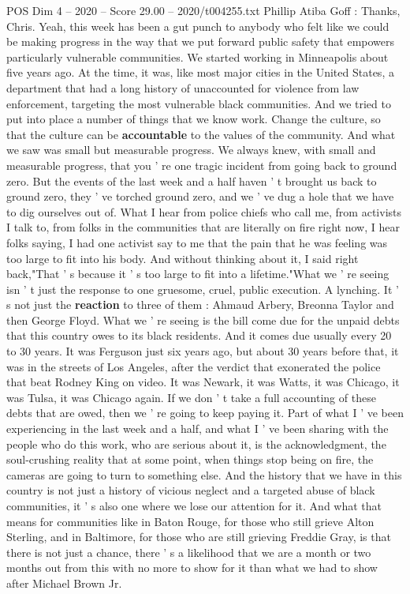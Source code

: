 \begin{textsample}{POS Dim 4 – 2020 – Score 29.00 – 2020/t004255.txt}
Phillip Atiba Goff : Thanks, Chris.
Yeah, this week has been a gut punch to anybody who felt like we could be making progress in the way that we put forward public safety that empowers particularly vulnerable communities.
We started working in Minneapolis about five years ago.
At the time, it was, like most major cities in the United States, a department that had a long history of unaccounted for violence from law enforcement, targeting the most vulnerable black communities.
And we tried to put into place a number of things that we know work.
Change the culture, so that the culture can be \textbf{accountable} to the values of the community.
And what we saw was small but measurable progress.
We always knew, with small and measurable progress, that you ' re one tragic incident from going back to ground zero.
But the events of the last week and a half haven ' t brought us back to ground zero, they ' ve torched ground zero, and we ' ve dug a hole that we have to dig ourselves out of.
What I hear from police chiefs who call me, from activists I talk to, from folks in the communities that are literally on fire right now, I hear folks saying, I had one activist say to me that the pain that he was feeling was too large to fit into his body.
And without thinking about it, I said right back,"That ' s because it ' s too large to fit into a lifetime."What we ' re seeing isn ' t just the response to one gruesome, cruel, public execution.
A lynching.
It ' s not just the \textbf{reaction} to three of them : Ahmaud Arbery, Breonna Taylor and then George Floyd.
What we ' re seeing is the bill come due for the unpaid debts that this country owes to its black residents.
And it comes due usually every 20 to 30 years.
It was Ferguson just six years ago, but about 30 years before that, it was in the streets of Los Angeles, after the verdict that exonerated the police that beat Rodney King on video.
It was Newark, it was Watts, it was Chicago, it was Tulsa, it was Chicago again.
If we don ' t take a full accounting of these debts that are owed, then we ' re going to keep paying it.
Part of what I ' ve been experiencing in the last week and a half, and what I ' ve been sharing with the people who do this work, who are serious about it, is the acknowledgment, the soul-crushing reality that at some point, when things stop being on fire, the cameras are going to turn to something else.
And the history that we have in this country is not just a history of vicious neglect and a targeted abuse of black communities, it ' s also one where we lose our attention for it.
And what that means for communities like in Baton Rouge, for those who still grieve Alton Sterling, and in Baltimore, for those who are still grieving Freddie Gray, is that there is not just a chance, there ' s a likelihood that we are a month or two months out from this with no more to show for it than what we had to show after Michael Brown Jr.

\end{textsample}
